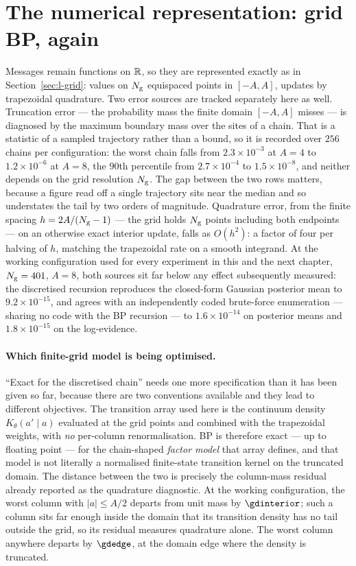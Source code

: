 \section{The numerical representation: grid BP, again}\label{sec:em-numerical}

Messages remain functions on $\mathbb{R}$, so they are represented exactly as in
Section~\ref{sec:l-grid}: values on $N_{\mathrm{g}}$ equispaced points in $[-A,A]$, updates
by trapezoidal quadrature. Two error sources are tracked separately here as
well. Truncation error --- the probability mass the finite domain $[-A,A]$
misses --- is diagnosed by the maximum boundary mass over the sites of a chain.
That is a statistic of a sampled trajectory rather than a bound, so it is
recorded over $256$ chains per configuration: the worst chain falls from
$2.3\times10^{-3}$ at $A=4$ to $1.2\times10^{-6}$ at $A=8$, the $90$th
percentile from $2.7\times10^{-4}$ to $1.5\times10^{-8}$, and neither depends on
the grid resolution $N_{\mathrm{g}}$. The gap between the two rows matters, because a figure
read off a single trajectory sits near the median and so understates the tail by
two orders of magnitude. Quadrature error, from the
finite spacing $h=2A/(N_{\mathrm{g}}-1)$ --- the grid holds $N_{\mathrm{g}}$ points including both
endpoints --- on an otherwise exact interior update, falls as
$O(h^2)$: a factor of four per halving of $h$, matching the trapezoidal
rate on a smooth integrand. At the working configuration used for every
experiment in this and the next chapter, $N_{\mathrm{g}}=401$, $A=8$, both sources sit far
below any effect subsequently measured: the discretised recursion reproduces
the closed-form Gaussian posterior mean to $9.2\times10^{-15}$, and agrees
with an independently coded brute-force enumeration --- sharing no code with
the BP recursion --- to $1.6\times10^{-14}$ on posterior means and
$1.8\times10^{-15}$ on the log-evidence.

\paragraph{Which finite-grid model is being optimised.} ``Exact for the
discretised chain'' needs one more specification than it has been given so far,
because there are two conventions available and they lead to different
objectives. The transition array used here is the continuum density
$K_\theta(a' \mid a)$ evaluated at the grid points and combined with the
trapezoidal weights, with \emph{no} per-column renormalisation. BP is therefore
exact --- up to floating point --- for the chain-shaped \emph{factor model} that
array defines, and that model is not literally a normalised finite-state
transition kernel on the truncated domain. The distance between the two is
precisely the column-mass residual already reported as the quadrature
diagnostic. At the working configuration, the worst column with $|a| \le A/2$
departs from unit mass by $\gdinterior$; such a column sits far enough inside
the domain that its transition density has no tail outside the grid, so its
residual measures quadrature alone. The worst column anywhere departs by
$\gdedge$, at the domain edge where the density is truncated.

